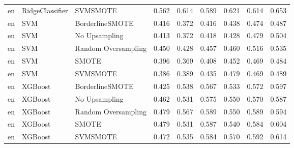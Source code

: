 \begin{tabular}{lllllllll}
      en &              RidgeClassifier &            SVMSMOTE & 0.562 &                     0.614 &                 0.589 &                  0.621 &                                   0.614 &     0.653 \\
      en &                          SVM &     BorderlineSMOTE & 0.416 &                     0.372 &                 0.416 &                  0.438 &                                   0.474 &     0.487 \\
      en &                          SVM &       No Upsampling & 0.413 &                     0.372 &                 0.418 &                  0.428 &                                   0.479 &     0.504 \\
      en &                          SVM & Random Oversampling & 0.450 &                     0.428 &                 0.457 &                  0.460 &                                   0.516 &     0.535 \\
      en &                          SVM &               SMOTE & 0.396 &                     0.369 &                 0.408 &                  0.452 &                                   0.469 &     0.484 \\
      en &                          SVM &            SVMSMOTE & 0.386 &                     0.389 &                 0.435 &                  0.479 &                                   0.469 &     0.489 \\
      en &                      XGBoost &     BorderlineSMOTE & 0.425 &                     0.538 &                 0.567 &                  0.533 &                                   0.572 &     0.597 \\
      en &                      XGBoost &       No Upsampling & 0.462 &                     0.531 &                 0.575 &                  0.550 &                                   0.570 &     0.587 \\
      en &                      XGBoost & Random Oversampling & 0.479 &                     0.567 &                 0.589 &                  0.550 &                                   0.589 &     0.594 \\
      en &                      XGBoost &               SMOTE & 0.479 &                     0.531 &                 0.587 &                  0.540 &                                   0.584 &     0.604 \\
      en &                      XGBoost &            SVMSMOTE & 0.472 &                     0.535 &                 0.584 &                  0.570 &                                   0.592 &     0.614 \\

\end{tabular}

